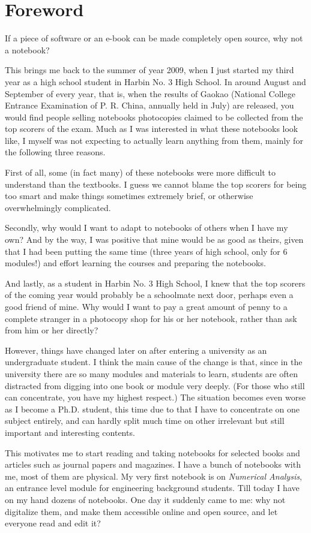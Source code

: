 \chapter*{Foreword}
If a piece of software or an e-book can be made completely open source, why not a notebook?

This brings me back to the summer of year 2009, when I just started my third year as a high school student in Harbin No. 3 High School. In around August and September of every year, that is, when the results of Gaokao (National College Entrance Examination of P. R. China, annually held in July) are released, you would find people selling notebooks photocopies claimed to be collected from the top scorers of the exam. Much as I was interested in what these notebooks look like, I myself was not expecting to actually learn anything from them, mainly for the following three reasons.

First of all, some (in fact many) of these notebooks were more difficult to understand than the textbooks. I guess we cannot blame the top scorers for being too smart and make things sometimes extremely brief, or otherwise overwhelmingly complicated.

Secondly, why would I want to adapt to notebooks of others when I have my own? And by the way, I was positive that mine would be as good as theirs, given that I had been putting the same time (three years of high school, only for 6 modules!) and effort learning the courses and preparing the notebooks.

And lastly, as a student in Harbin No. 3 High School, I knew that the top scorers of the coming year would probably be a schoolmate next door, perhaps even a good friend of mine. Why would I want to pay a great amount of penny to a complete stranger in a photocopy shop for his or her notebook, rather than ask from him or her directly?

However, things have changed later on after entering a university as an undergraduate student. I think the main cause of the change is that, since in the university there are so many modules and materials to learn, students are often distracted from digging into one book or module very deeply. (For those who still can concentrate, you have my highest respect.) The situation becomes even worse as I become a Ph.D. student, this time due to that I have to concentrate on one subject entirely, and can hardly split much time on other irrelevant but still important and interesting contents.

This motivates me to start reading and taking notebooks for selected books and articles such as journal papers and magazines. I have a bunch of notebooks with me, most of them are physical. My very first notebook is on \textit{Numerical Analysis}, an entrance level module for engineering background students. Till today I have on my hand dozens of notebooks. One day it suddenly came to me: why not digitalize them, and make them accessible online and open source, and let everyone read and edit it?

